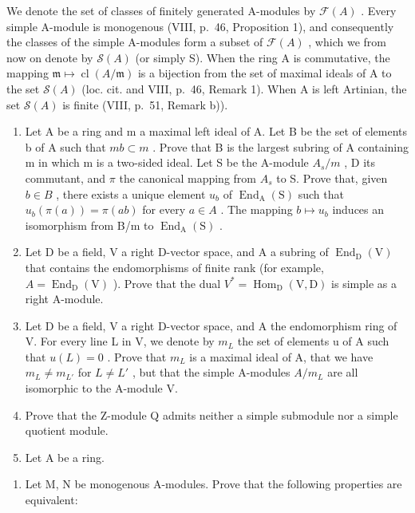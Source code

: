 We denote the set of classes of finitely generated A-modules by \(\mathcal{F}(A)\) . Every simple A-module is monogenous (VIII, p.~46, Proposition 1), and consequently the classes of the simple A-modules form a subset of \(\mathcal{F}(A)\) , which we from now on denote by \(\mathcal{S}(A)\) (or simply S). When the ring A is commutative, the mapping \(\mathfrak{m} \mapsto \operatorname{cl}(A/\mathfrak{m})\) is a bijection from the set of maximal ideals of A to the set \(\mathcal{S}(A)\) (loc. cit. and VIII, p.~46, Remark 1). When A is left Artinian, the set \(\mathcal{S}(A)\) is finite (VIII, p.~51, Remark b)).


\begin{enumerate}
\def\labelenumi{\arabic{enumi})}
\item
  Let A be a ring and m a maximal left ideal of A. Let B be the set of elements b of A such that \(mb \subset m\) . Prove that B is the largest subring of A containing m in which m is a two-sided ideal. Let S be the A-module \(A_{s}/m\) , D its commutant, and \(\pi\) the canonical mapping from \(A_{s}\) to S. Prove that, given \(b \in B\) , there exists a unique element \(u_{b}\) of \(\operatorname{End}_{\mathrm{A}}(\mathrm{S})\) such that \(u_{b}(\pi(a)) = \pi(ab)\) for every \(a \in A\) . The mapping \(b \mapsto u_{b}\) induces an isomorphism from B/m to \(\operatorname{End}_{\mathrm{A}}(\mathrm{S})\) .
\item
  Let D be a field, V a right D-vector space, and A a subring of \(\operatorname{End}_{\mathrm{D}}(\mathrm{V})\) that contains the endomorphisms of finite rank (for example, \(A = \operatorname{End}_{\mathrm{D}}(\mathrm{V})\) ). Prove that the dual \(V^{*} = \operatorname{Hom}_{\mathrm{D}}(\mathrm{V}, \mathrm{D})\) is simple as a right A-module.
\item
  Let D be a field, V a right D-vector space, and A the endomorphism ring of V. For every line L in V, we denote by \(m_{L}\) the set of elements u of A such that \(u(L)=0\) . Prove that \(m_{L}\) is a maximal ideal of A, that we have \(m_{L}\neq m_{L'}\) for \(L\neq L'\) , but that the simple A-modules \(A/m_{L}\) are all isomorphic to the A-module V.
\item
  Prove that the Z-module Q admits neither a simple submodule nor a simple quotient module.
\item
  Let \(\mathrm{A}\) be a ring.
\end{enumerate}

\begin{enumerate}
\def\labelenumi{\alph{enumi})}
\tightlist
\item
  Let M, N be monogenous A-modules. Prove that the following properties are equivalent:
\end{enumerate}

